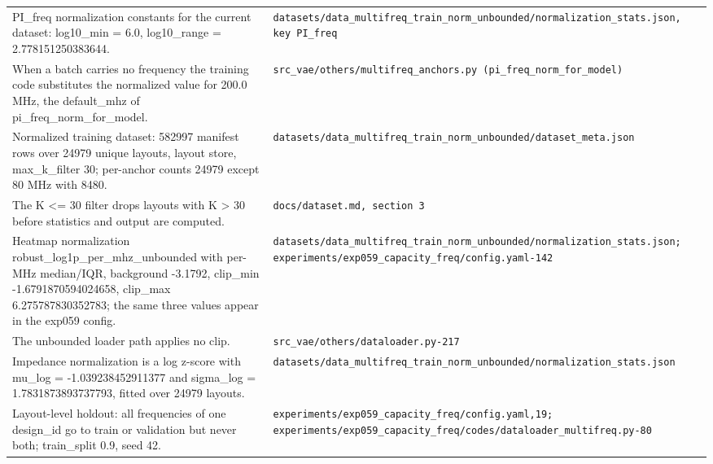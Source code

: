 \begin{longtable}{p{} p{}}
PI\_freq normalization constants for the current dataset: log10\_min = 6.0, log10\_range = 2.778151250383644. & \texttt{datasets/\allowbreak{}data\_\allowbreak{}multifreq\_\allowbreak{}train\_\allowbreak{}norm\_\allowbreak{}unbounded/\allowbreak{}normalization\_\allowbreak{}stats.json, key PI\_\allowbreak{}freq} \\
When a batch carries no frequency the training code substitutes the normalized value for 200.0 MHz, the default\_mhz of pi\_freq\_norm\_for\_model. & \texttt{src\_\allowbreak{}vae/\allowbreak{}others/\allowbreak{}multifreq\_\allowbreak{}anchors.py (pi\_\allowbreak{}freq\_\allowbreak{}norm\_\allowbreak{}for\_\allowbreak{}model)} \\
Normalized training dataset: 582997 manifest rows over 24979 unique layouts, layout store, max\_k\_filter 30; per-anchor counts 24979 except 80 MHz with 8480. & \texttt{datasets/\allowbreak{}data\_\allowbreak{}multifreq\_\allowbreak{}train\_\allowbreak{}norm\_\allowbreak{}unbounded/\allowbreak{}dataset\_\allowbreak{}meta.json} \\
The K <= 30 filter drops layouts with K > 30 before statistics and output are computed. & \texttt{docs/\allowbreak{}dataset.md, section 3} \\
Heatmap normalization robust\_log1p\_per\_mhz\_unbounded with per-MHz median/IQR, background -3.1792, clip\_min -1.6791870594024658, clip\_max 6.275787830352783; the same three values appear in the exp059 config. & \texttt{datasets/\allowbreak{}data\_\allowbreak{}multifreq\_\allowbreak{}train\_\allowbreak{}norm\_\allowbreak{}unbounded/\allowbreak{}normalization\_\allowbreak{}stats.json; experiments/\allowbreak{}exp059\_\allowbreak{}capacity\_\allowbreak{}freq/\allowbreak{}config.yaml-142} \\
The unbounded loader path applies no clip. & \texttt{src\_\allowbreak{}vae/\allowbreak{}others/\allowbreak{}dataloader.py-217} \\
Impedance normalization is a log z-score with mu\_log = -1.039238452911377 and sigma\_log = 1.7831873893737793, fitted over 24979 layouts. & \texttt{datasets/\allowbreak{}data\_\allowbreak{}multifreq\_\allowbreak{}train\_\allowbreak{}norm\_\allowbreak{}unbounded/\allowbreak{}normalization\_\allowbreak{}stats.json} \\
Layout-level holdout: all frequencies of one design\_id go to train or validation but never both; train\_split 0.9, seed 42. & \texttt{experiments/\allowbreak{}exp059\_\allowbreak{}capacity\_\allowbreak{}freq/\allowbreak{}config.yaml,19; experiments/\allowbreak{}exp059\_\allowbreak{}capacity\_\allowbreak{}freq/\allowbreak{}codes/\allowbreak{}dataloader\_\allowbreak{}multifreq.py-80} \\
\hline
\end{longtable}
\endgroup

